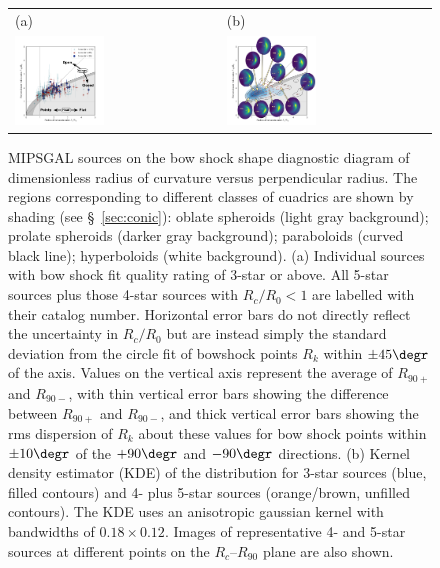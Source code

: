 \begin{figure}
  \centering
  \begin{tabular}{ll}
    (a) & (b) \\
    \includegraphics[width=0.45\textwidth, trim=0 0 30 0]
    {figs/mipsgal-Rc-R90-zoom-annotated}
        & \includegraphics[width=0.45\textwidth, trim=0 0 30 0]
          {figs/mipsgal-Rc-R90-thumbnails} 
  \end{tabular}
  \caption[]{MIPSGAL sources on the bow shock shape diagnostic diagram
    of dimensionless radius of curvature versus perpendicular radius.
    The regions corresponding to different classes of cuadrics are
    shown by shading (see \S~\ref{sec:conic}): oblate spheroids (light
    gray background); prolate spheroids (darker gray background);
    paraboloids (curved black line); hyperboloids (white background).
    (a) Individual sources with bow shock fit quality rating of 3-star
    or above.  All 5-star sources plus those 4-star sources with
    \(R_c/R_0 < 1\) are labelled with their \cite{Kobulnicky:2016a}
    catalog number.  Horizontal error bars do not directly reflect the
    uncertainty in \(R_c/R_0\) but are instead simply the standard
    deviation from the circle fit of bowshock points \(R_k\) within
    \(\pm 45\degr\) of the axis.  Values on the vertical axis
    represent the average of \(R_{90+}\) and \(R_{90-}\), with thin
    vertical error bars showing the difference between \(R_{90+}\) and
    \(R_{90-}\), and thick vertical error bars showing the rms
    dispersion of \(R_k\) about these values for bow shock points
    within \(\pm 10\degr\) of the \(+90\degr\) and \(-90\degr\)
    directions.  (b) Kernel density estimator (KDE) of the
    distribution for 3-star sources (blue, filled contours) and 4-
    plus 5-star sources (orange/brown, unfilled contours).  The KDE
    uses an anisotropic gaussian kernel with bandwidths of
    \(0.18 \times 0.12\). Images of representative 4- and 5-star sources at
    different points on the \(R_c\)--\(R_{90}\) plane are also shown.}
  \label{fig:mipsgal-shapes}
\end{figure}

